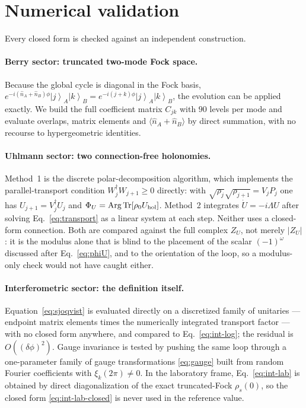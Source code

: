 \documentclass[11pt]{article}
\newcommand{\ket}[1]{\left|#1\right\rangle}
\newcommand{\Tr}{\operatorname{Tr}}
\newcommand{\Arg}{\operatorname{Arg}}
\newcommand{\nop}{\hat n}
\begin{document}
\section{Numerical validation}
\label{sec:numerics}

Every closed form is checked against an independent construction.

\paragraph{Berry sector: truncated two-mode Fock space.}
Because the global cycle is diagonal in the Fock basis,
$e^{-i(\nop_A+\nop_B)\phi}\ket{j}_A\ket{k}_B=e^{-i(j+k)\phi}\ket{j}_A\ket{k}_B$,
the evolution can be applied exactly. We build the full coefficient matrix
$C_{jk}$ with $90$ levels per mode and evaluate overlaps, matrix elements and
$\langle\nop_A+\nop_B\rangle$ by direct summation, with no recourse to
hypergeometric identities.

\paragraph{Uhlmann sector: two connection-free holonomies.}
Method~1 is the discrete polar-decomposition algorithm, which implements the
parallel-transport condition $W_j^\dagger W_{j+1}\ge0$ directly: with
$\sqrt{\rho_j}\sqrt{\rho_{j+1}}=V_jP_j$ one has $U_{j+1}=V_j^\dagger U_j$ and
$\Phi_U=\Arg\Tr[\rho_0U_{\rm hol}]$. Method~2 integrates
$\dot U=-i\Lambda U$ after solving Eq.~\eqref{eq:transport} as a linear system
at each step. Neither uses a closed-form connection. Both are compared against
the full complex $Z_U$, not merely $|Z_U|$: it is the modulus alone that is
blind to the placement of the scalar $(-1)^\omega$ discussed after
Eq.~\eqref{eq:phiU}, and to the orientation of the loop, so a modulus-only
check would not have caught either.

\paragraph{Interferometric sector: the definition itself.}
Equation~\eqref{eq:sjoqvist} is evaluated directly on a discretized family of
unitaries --- endpoint matrix elements times the numerically integrated
transport factor --- with no closed form anywhere, and compared to
Eq.~\eqref{eq:int-log}; the residual is $O((\delta\phi)^2)$. Gauge invariance is
tested by pushing the same loop through a one-parameter family of gauge
transformations \eqref{eq:gauge} built from random Fourier coefficients with
$\xi_k(2\pi)\neq0$. In the laboratory frame, Eq.~\eqref{eq:int-lab} is obtained
by direct diagonalization of the exact truncated-Fock $\rho_s(0)$, so the
closed form \eqref{eq:int-lab-closed} is never used in the reference value.
\end{document}
